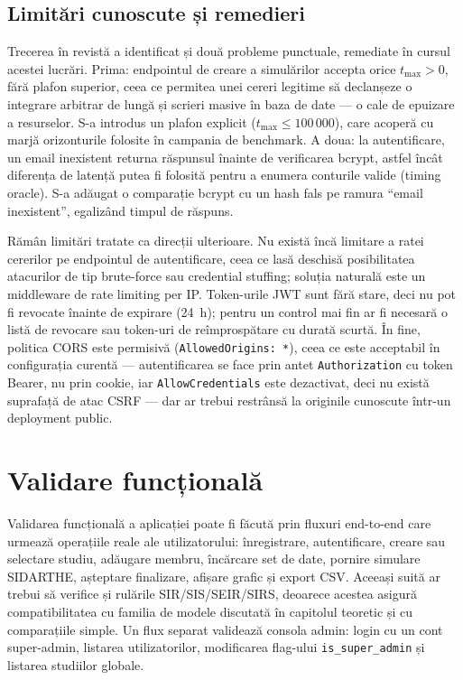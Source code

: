 \subsection{Limitări cunoscute și remedieri}
\label{subsec:sec_limitari}

Trecerea în revistă a identificat și două probleme punctuale, remediate în cursul
acestei lucrări. Prima: endpointul de creare a simulărilor accepta orice
$t_{\max}>0$, fără plafon superior, ceea ce permitea unei cereri legitime să
declanșeze o integrare arbitrar de lungă și scrieri masive în baza de date --- o
cale de epuizare a resurselor. S-a introdus un plafon explicit
($t_{\max}\le 100\,000$), care acoperă cu marjă orizonturile folosite în campania
de benchmark. A doua: la autentificare, un email inexistent returna răspunsul
înainte de verificarea bcrypt, astfel încât diferența de latență putea fi folosită
pentru a enumera conturile valide (timing oracle). S-a adăugat o comparație bcrypt
cu un hash fals pe ramura ``email inexistent'', egalizând timpul de răspuns.

Rămân limitări tratate ca direcții ulterioare. Nu există încă limitare a ratei
cererilor pe endpointul de autentificare, ceea ce lasă deschisă posibilitatea
atacurilor de tip brute-force sau credential stuffing; soluția naturală este un
middleware de rate limiting per IP. Token-urile JWT sunt fără stare, deci nu pot fi
revocate înainte de expirare (24~h); pentru un control mai fin ar fi necesară o
listă de revocare sau token-uri de reîmprospătare cu durată scurtă. În fine,
politica CORS este permisivă (\texttt{AllowedOrigins: *}), ceea ce este acceptabil
în configurația curentă --- autentificarea se face prin antet \texttt{Authorization}
cu token Bearer, nu prin cookie, iar \texttt{AllowCredentials} este dezactivat,
deci nu există suprafață de atac CSRF --- dar ar trebui restrânsă la originile
cunoscute într-un deployment public.

\section{Validare funcțională}
\label{sec:testare_functionala}

Validarea funcțională a aplicației poate fi făcută prin fluxuri end-to-end care
urmează operațiile reale ale utilizatorului: înregistrare, autentificare, creare
sau selectare studiu, adăugare membru, încărcare set de date, pornire simulare
SIDARTHE, așteptare finalizare, afișare grafic și export CSV. Aceeași suită ar
trebui să verifice și rulările SIR/SIS/SEIR/SIRS, deoarece acestea asigură
compatibilitatea cu familia de modele discutată în capitolul teoretic și cu
comparațiile simple. Un flux separat validează consola
admin: login cu un cont super-admin, listarea utilizatorilor, modificarea
flag-ului \texttt{is\_super\_admin} și listarea studiilor globale.
